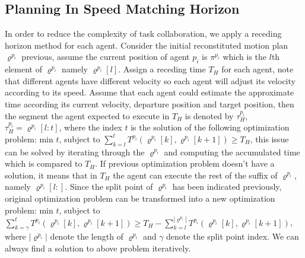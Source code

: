\documentclass[journal]{IEEEtran}
\begin{document}
\subsection{Planning In Speed Matching Horizon}
In order to reduce the complexity of task collaboration, we apply a receding horizon method for each agent. Consider the initial reconstituted motion plan $\varrho^{p_i}$ previous, assume the current position of agent $p_i$ is $\pi^{p_i}$ which is the $l$th element of $\varrho^{p_i}$ namely $\varrho^{p_i}[l]$. Assign a receding time $T_H$ for each agent, note that different agents have different velocity so each agent will adjust its velocity according to its speed. Assume that each agent could estimate the approximate time according its current velocity, departure position and target position, then the segment the agent expected to execute in $T_H$ is denoted by $\tau^{p_i}_H$, $\tau^{p_i}_H = \varrho^{p_i}[l:t]$, where the index $t$ is the solution of the following optimization problem: min $t$, subject to $\sum_{k=l}^{t}T^{p_i}(\varrho^{p_i}[k],\varrho^{p_i}[k+1])\geq T_H$, this issue can be solved by iterating through the $\varrho^{p_i}$ and computing the accumulated time which is compared to $T_H$. If previous optimization problem doesn't have a solution, it means that in $T_H$ the agent can execute the rest of the suffix of $\varrho^{p_i}$, namely $\varrho^{p_i}[l:]$. Since the split point of $\varrho^{p_i}$ has been indicated previously, original optimization problem can be transformed into a new optimization problem: min $t$, subject to $\sum_{k=\gamma}^{t}T^{p_i}(\varrho^{p_i}[k],\varrho^{p_i}[k+1])\geq T_H - \sum_{k=l}^{|\varrho^{p_i}|}T^{p_i}(\varrho^{p_i}[k],\varrho^{p_i}[k+1])$, where $|\varrho^{p_i}|$ denote the length of $\varrho^{p_i}$ and $\gamma$ denote the split point index. We can always find a solution to above problem iteratively.
\end{document}
